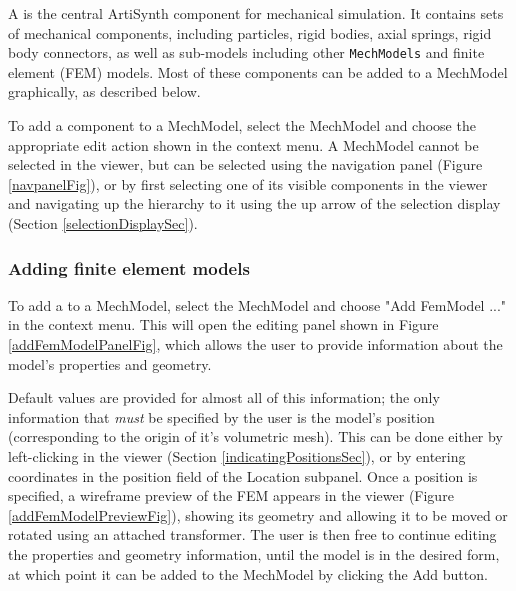 \documentclass{article}
\begin{document}
A  is the central ArtiSynth
component for mechanical simulation. It contains sets of mechanical
components, including particles, rigid bodies, axial springs, rigid
body connectors, as well as sub-models including other {\tt MechModels}
and finite element (FEM) models. Most of these components can be added to a
MechModel graphically, as described below.

To add a component to a MechModel, select the MechModel and choose the
appropriate edit action shown in the context menu. A MechModel cannot
be selected in the viewer, but can be selected using the navigation
panel (Figure \ref{navpanelFig}), or by first selecting one of its visible
components in the viewer and navigating up the hierarchy to it using
the {\sf up arrow} of the selection display (Section \ref{selectionDisplaySec}).

\subsubsection{Adding finite element models}

To add a  to a MechModel,
select the MechModel and choose {\sf "Add FemModel ..."} in the context
menu.  This will open the editing panel shown in Figure \ref{addFemModelPanelFig},
which allows the user to provide information about the model's
properties and geometry.

Default values are provided for almost all of this information; the
only information that {\it must} be specified by the user is the model's
position (corresponding to the origin of it's volumetric mesh). This
can be done either by left-clicking in the viewer
(Section \ref{indicatingPositionsSec}), or by entering coordinates in the
{\sf position} field of the {\sf Location} subpanel.  Once a position is
specified, a wireframe preview of the FEM appears in the viewer
(Figure \ref{addFemModelPreviewFig}), showing its geometry and allowing it to be
moved or rotated using an attached transformer. The user is then free
to continue editing the properties and geometry information, until the
model is in the desired form, at which point it can be added to the
MechModel by clicking the {\sf Add} button.
\end{document}
